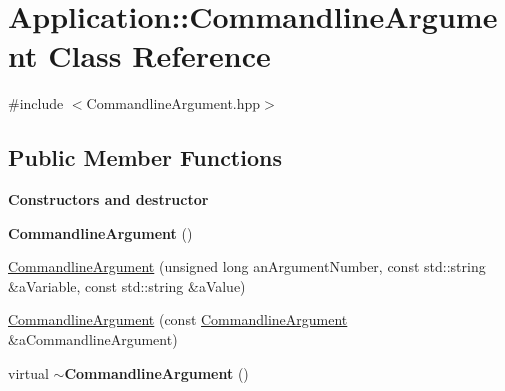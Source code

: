 \hypertarget{class_application_1_1_commandline_argument}{}\section{Application\+:\+:Commandline\+Argument Class Reference}
\label{class_application_1_1_commandline_argument}


{\ttfamily \#include $<$Commandline\+Argument.\+hpp$>$}

\subsection*{Public Member Functions}
\begin{Indent}{\bf Constructors and destructor}\par
\begin{DoxyCompactItemize}
\item 
{\bfseries Commandline\+Argument} ()\hypertarget{class_application_1_1_commandline_argument_a8d1a860e8afe53e8b6f05e9f2dd4dce7}{}\label{class_application_1_1_commandline_argument_a8d1a860e8afe53e8b6f05e9f2dd4dce7}

\item 
\hyperlink{class_application_1_1_commandline_argument_a0bfdc3e855d3eda7c231d7e6c49cf0ef}{Commandline\+Argument} (unsigned long an\+Argument\+Number, const std\+::string \&a\+Variable, const std\+::string \&a\+Value)
\item 
\hyperlink{class_application_1_1_commandline_argument_a9f540c035645fc326ffd8d25fb6dce47}{Commandline\+Argument} (const \hyperlink{class_application_1_1_commandline_argument}{Commandline\+Argument} \&a\+Commandline\+Argument)
\item 
virtual {\bfseries $\sim$\+Commandline\+Argument} ()\hypertarget{class_application_1_1_commandline_argument_abfce42a49b80cb1c67d86bef4f0ac149}{}\label{class_application_1_1_commandline_argument_abfce42a49b80cb1c67d86bef4f0ac149}

\end{DoxyCompactItemize}
\end{Indent}
